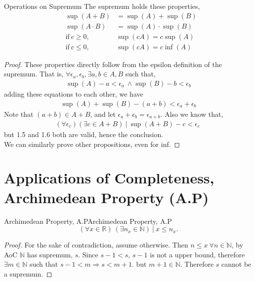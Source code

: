 \begin{prop}{Operations on Supremum}
    The supremum holds these properties,
    \begin{align}
        & \sup(A+B)            & = \sup(A) + \sup(B)     \\
        & \sup(A \cdot B)      & = \sup(A) \cdot \sup(B) \\
        & \text{if} \ c \ge 0, & \sup(cA) = c\sup(A)     \\
        & \text{if} \ c \le 0, & \sup(cA) = c\inf(A)
    \end{align}
    \begin{proof}
        These properties directly follow from the epsilon definition of
        the supremum. That is, $\forall \epsilon_a, \epsilon_b, \exists
        a,b \in A,B$ such that,
        \begin{align*}
            \sup(A) -a < \epsilon_a \ \land \sup(B) -b < \epsilon_b
        \end{align*}
        adding these equations to each other, we have
        \begin{align}
            \sup(A) + \sup(B) - (a+b) < \epsilon_a + \epsilon_b
        \end{align}
        Note that $(a+b) \in A+B$, and let $\epsilon_a + \epsilon_b =
        \epsilon_{a+b}$. Also we know that,
        \begin{align}
            (\forall \epsilon_c)( \exists c \in A+B) \ | \ \sup(A+B)- c < \epsilon_c \
        \end{align}
        but 1.5 and 1.6 both are valid, hence the conclusion. \\
        We can similarly prove other propositions, even for inf.
    \end{proof}
\end{prop}

\section{Applications of Completeness, Archimedean Property (A.P)}

\begin{theo}{Archimedean Property, A.P}{Archimedean Property, A.P}
    \[(\forall x \in \mathbb{R}) \ (\exists n_x \in \mathbb{N})\  | \ x \le n_x.\]
    \tcblower
    \begin{proof}
        For the sake of contradiction, assume otherwise. Then $n \le
        x\ \forall n \in \mathbb{N}$, by AoC $\mathbb{N}$ has supremum,
        $s$. Since $s-1 < s$, $s-1$ is not a upper bound, therefore
        $\exists m \in \mathbb{N}$ such that $s-1 < m \Rightarrow s <
        m+1$. but $m+1 \in \mathbb{N}$. Therefore $s$ cannot be a supremum.
    \end{proof}
\end{theo}

